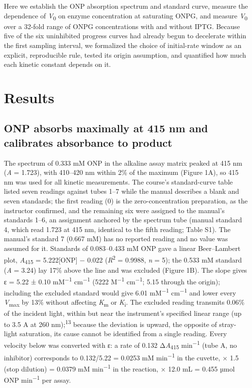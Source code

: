 \documentclass[9pt,twocolumn]{extarticle}
\newcommand{\cit}[1]{\textsuperscript{#1}}
\newcommand{\Km}{\textit{K}\textsubscript{m}}
\newcommand{\Vmax}{\textit{V}\textsubscript{max}}
\newcommand{\Vo}{\textit{V}\textsubscript{0}}
\newcommand{\Ki}{\textit{K}\textsubscript{i}}
\newcommand{\Rsq}{\textit{R}\textsuperscript{2}}
\newcommand{\Aa}{\textit{A}\textsubscript{415}}
\newcommand{\dAa}{Δ\textit{A}\textsubscript{415}}
\newcommand{\permin}{min\textsuperscript{−1}}
\newcommand{\epsunits}{mM\textsuperscript{−1} cm\textsuperscript{−1}}
\newcommand{\dash}{–}
\begin{document}
Here we establish the ONP absorption spectrum and standard curve, measure the dependence of \Vo{} on enzyme concentration at saturating ONPG, and measure \Vo{} over a 32-fold range of ONPG concentrations with and without IPTG. Because five of the six uninhibited progress curves had already begun to decelerate within the first sampling interval, we formalized the choice of initial-rate window as an explicit, reproducible rule, tested its origin assumption, and quantified how much each kinetic constant depends on it.

\section{Results}

\subsection{ONP absorbs maximally at 415 nm and calibrates absorbance to product}
The spectrum of 0.333 mM ONP in the alkaline assay matrix peaked at 415 nm (\textit{A} = 1.723), with 410\dash 420 nm within 2\% of the maximum (Figure 1A), so 415 nm was used for all kinetic measurements. The course's standard-curve table listed seven readings against tubes 1\dash 7 while the manual describes a blank and seven standards; the first reading (0) is the zero-concentration preparation, as the instructor confirmed, and the remaining six were assigned to the manual's standards 1\dash 6, an assignment anchored by the spectrum tube (manual standard 4, which read 1.723 at 415 nm, identical to the fifth reading; Table S1). The manual's standard 7 (0.667 mM) has no reported reading and no value was assumed for it. Standards of 0.083\dash 0.433 mM ONP gave a linear Beer\dash Lambert plot, \Aa{} = 5.222[ONP] − 0.022 (\Rsq{} = 0.9988, \textit{n} = 5); the 0.533 mM standard (\textit{A} = 3.24) lay 17\% above the line and was excluded (Figure 1B). The slope gives ε = 5.22 ± 0.10 \epsunits{} (5222 M\textsuperscript{−1} cm\textsuperscript{−1}; 5.15 through the origin); including the excluded standard would give 6.01 \epsunits{} and lower every \Vmax{} by 13\% without affecting \Km{} or \Ki. The excluded reading transmits 0.06\% of the incident light, within but near the instrument's specified linear range (up to 3.5 A at 260 nm);\cit{13} because the deviation is upward, the opposite of stray-light saturation, its cause cannot be identified from a single reading. Every velocity below was converted with ε: a rate of 0.132 \dAa{} \permin{} (tube A, no inhibitor) corresponds to 0.132/5.22 = 0.0253 mM \permin{} in the cuvette, × 1.5 (stop dilution) = 0.0379 mM \permin{} in the reaction, × 12.0 mL = 0.455 µmol ONP \permin{} per assay.
\end{document}
